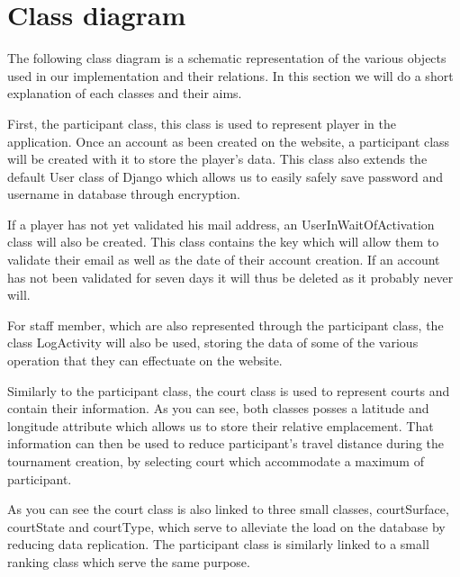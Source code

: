 \section{Class diagram}


The following class diagram is a schematic representation of the various objects used in our implementation and their relations. In this section we will do a short explanation of each classes and their aims.\newline

First, the participant class, this class is used to represent player in the application. Once an account as been created on the website, a participant class will be created with it to store the player's data. This class also extends the default User class of Django which allows us to easily safely save password and username in database through encryption.\newline

If a player has not yet validated his mail address, an UserInWaitOfActivation class will also be created. This class contains the key which will allow them to validate their email as well as the date of their account creation. If an account has not been validated for seven days it will thus be deleted as it probably never will.\newline

For staff member, which are also represented through the participant class, the class LogActivity will also be used, storing the data of some of the various operation that they can effectuate on the website. \newline

Similarly to the participant class, the court class is used to represent courts and contain their information. As you can see, both classes posses a latitude and longitude attribute which allows us to store their relative emplacement. That information can then be used to reduce participant's travel distance during the tournament creation, by selecting court which accommodate a maximum of participant. \newline

As you can see the court class is also linked to three small classes, courtSurface, courtState and courtType, which serve to alleviate the load on the database by reducing data replication. The participant class is similarly linked to a small ranking class which serve the same purpose. \newline

